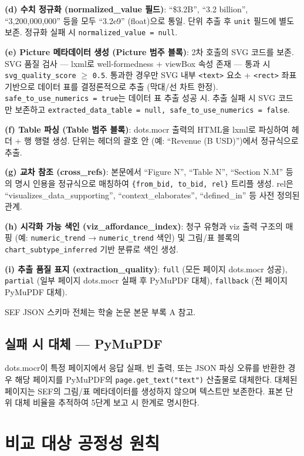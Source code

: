 \documentclass[11pt]{article}
\begin{document}
\textbf{(d) 수치 정규화 (normalized\_value 필드)}: ``\$3.2B'', ``3.2 billion'', ``3,200,000,000'' 등을 모두 ``3.2e9'' (float)으로 통일. 단위 추출 후 \texttt{unit} 필드에 별도 보존. 정규화 실패 시 \texttt{normalized\_value = null}.

\textbf{(e) Picture 메타데이터 생성 (Picture 범주 블록)}: 2차 호출의 SVG 코드를 보존. SVG 품질 검사 — lxml로 well-formedness + viewBox 속성 존재 — 통과 시 \texttt{svg\_quality\_score} $\geq$ \texttt{0.5}. 통과한 경우만 SVG 내부 \texttt{<text>} 요소 + \texttt{<rect>} 좌표 기반으로 데이터 표를 결정론적으로 추출 (막대/선 차트 한정). \texttt{safe\_to\_use\_numerics = true}는 데이터 표 추출 성공 시. 추출 실패 시 SVG 코드만 보존하고 \texttt{extracted\_data\_table = null, safe\_to\_use\_numerics = false}.

\textbf{(f) Table 파싱 (Table 범주 블록)}: dots.mocr 출력의 HTML을 lxml로 파싱하여 헤더 + 행 행렬 생성. 단위는 헤더의 괄호 안 (예: ``Revenue (B USD)'')에서 정규식으로 추출.

\textbf{(g) 교차 참조 (cross\_refs)}: 본문에서 ``Figure N'', ``Table N'', ``Section N.M'' 등의 명시 인용을 정규식으로 매칭하여 \texttt{\{from\_bid, to\_bid, rel\}} 트리플 생성. rel은 ``visualizes\_data\_supporting'', ``context\_elaborates'', ``defined\_in'' 등 사전 정의된 관계.

\textbf{(h) 시각화 가능 색인 (viz\_affordance\_index)}: 청구 유형과 viz 출력 구조의 매핑 (예: \texttt{numeric\_trend} → \texttt{numeric\_trend} 색인) 및 그림/표 블록의 \texttt{chart\_subtype\_inferred} 기반 분류로 색인 생성.

\textbf{(i) 추출 품질 표지 (extraction\_quality)}: \texttt{full} (모든 페이지 dots.mocr 성공), \texttt{partial} (일부 페이지 dots.mocr 실패 후 PyMuPDF 대체), \texttt{fallback} (전 페이지 PyMuPDF 대체).

SEF JSON 스키마 전체는 학술 논문 본문 부록 A 참고.

\subsection{실패 시 대체 — PyMuPDF}

dots.mocr이 특정 페이지에서 응답 실패, 빈 출력, 또는 JSON 파싱 오류를 반환한 경우 해당 페이지를 PyMuPDF의 \texttt{page.get\_text("text")} 산출물로 대체한다. 대체된 페이지는 SEF의 그림/표 메타데이터를 생성하지 않으며 텍스트만 보존한다. 표본 단위 대체 비율을 추적하여 5단계 보고 시 한계로 명시한다.

\section{비교 대상 공정성 원칙}
\label{sec:fairness}
\end{document}
